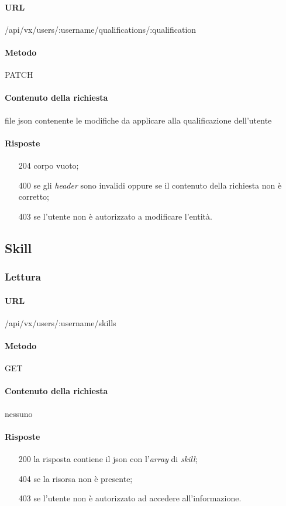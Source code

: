 \paragraph{URL}
/api/vx/users/:username/qualifications/:qualification
\paragraph{Metodo}
PATCH
\paragraph{Contenuto della richiesta}
file \gls{json} contenente le modifiche da applicare alla qualificazione dell'utente
\paragraph{Risposte}
\begin{itemize}
	\item[204] corpo vuoto;
	\item[400] se gli \emph{header} sono invalidi oppure se il contenuto della richiesta non è corretto;
	\item[403] se l'utente non è autorizzato a modificare l'entità.
\end{itemize}

\subsection{Skill}

\subsubsection{Lettura}
\paragraph{URL}
/api/vx/users/:username/skills
\paragraph{Metodo}
GET
\paragraph{Contenuto della richiesta}
nessuno
\paragraph{Risposte}
\begin{itemize}
	\item[200] la risposta contiene il \gls{json} con l'\emph{array} di \emph{skill};
	\item[404] se la risorsa non è presente;
	\item[403] se l'utente non è autorizzato ad accedere all'informazione.
\end{itemize}


